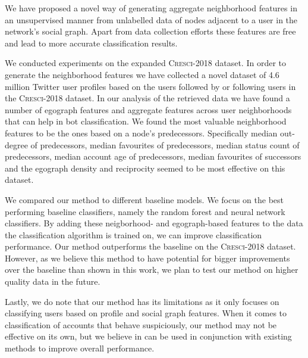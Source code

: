 \noindent We have proposed a novel way of generating aggregate neighborhood features in an unsupervised manner from unlabelled data of nodes adjacent to a user in the network's social graph. Apart from data collection efforts these features are free and lead to more accurate classification results. 

We conducted experiments on the expanded \textsc{Cresci-2018} dataset. In order to generate the neighborhood features we have collected a novel dataset of 4.6 million Twitter user profiles based on the users followed by or following users in the \textsc{Cresci-2018} dataset. In our analysis of the retrieved data we have found a number of egograph features and aggregate features across user neighborhoods that can help in bot classification. We found the most valuable neighborhood features to be the ones based on a node's predecessors. Specifically median out-degree of predecessors, median favourites of predecessors, median status count of predecessors, median account age of predecessors, median favourites of successors and the egograph density and reciprocity seemed to be most effective on this dataset. 

We compared our method to different baseline models. We focus on the best performing baseline classifiers, namely the random forest and neural network classifiers. By adding these neigborhood- and egograph-based features to the data the classification algorithm is trained on, we can improve classification performance. Our method outperforms the baseline on the \textsc{Cresci-2018} dataset. However, as we believe this method to have potential for bigger improvements over the baseline than shown in this work, we plan to test our method on higher quality data in the future.

Lastly, we do note that our method has its limitations as it only focuses on classifying users based on profile and social graph features. When it comes to classification of accounts that behave suspiciously, our method may not be effective on its own, but we believe in can be used in conjunction with existing methods to improve overall performance.